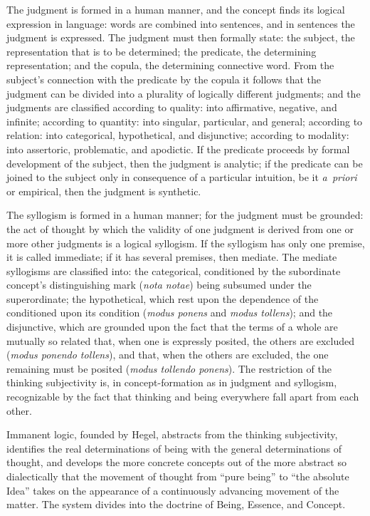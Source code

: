 \documentclass[12pt]{book}
\begin{document}
The judgment is formed in a human manner, and the concept finds its logical
expression in language: words are combined into sentences, and in sentences the
judgment is expressed. The judgment must then formally state: the subject, the
representation that is to be determined; the predicate, the determining
representation; and the copula, the determining connective word. From the
subject's connection with the predicate by the copula it follows that the
judgment can be divided into a plurality of logically different judgments; and
the judgments are classified according to quality: into affirmative, negative,
and infinite; according to quantity: into singular, particular, and general;
according to relation: into categorical, hypothetical, and disjunctive; according
to modality: into assertoric, problematic, and apodictic. If the predicate
proceeds by formal development of the subject, then the judgment is analytic; if
the predicate can be joined to the subject only in consequence of a particular
intuition, be it \textit{a~priori} or empirical, then the judgment is synthetic.

The syllogism is formed in a human manner; for the judgment must be grounded: the
act of thought by which the validity of one judgment is derived from one or more
other judgments is a logical syllogism. If the syllogism has only one premise, it
is called immediate; if it has several premises, then mediate. The mediate
syllogisms are classified into: the categorical, conditioned by the subordinate
concept's distinguishing mark (\textit{nota notae}) being subsumed under the
superordinate; the hypothetical, which rest upon the dependence of the
conditioned upon its condition (\textit{modus ponens} and \textit{modus
tollens}); and the disjunctive, which are grounded upon the fact that the terms
of a whole are mutually so related that, when one is expressly posited, the others
are excluded (\textit{modus ponendo tollens}), and that, when the others are
excluded, the one remaining must be posited (\textit{modus tollendo ponens}). The
restriction of the thinking subjectivity is, in concept-formation as in judgment
and syllogism, recognizable by the fact that thinking and being everywhere fall
apart from each other.

Immanent logic, founded by Hegel, abstracts from the thinking subjectivity,
identifies the real determinations of being with the general determinations of
thought, and develops the more concrete concepts out of the more abstract so
dialectically that the movement of thought from ``pure being'' to ``the absolute
Idea'' takes on the appearance of a continuously advancing movement of the
matter. The system divides into the doctrine of Being, Essence, and Concept.
\end{document}

